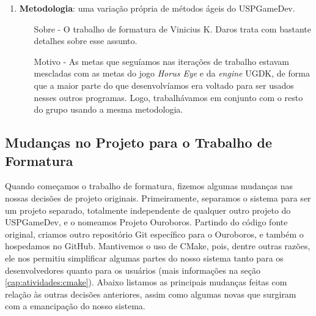 \begin{enumerate}
    \item \textbf{Metodologia}: uma variação própria de métodos ágeis do USPGameDev.
      \begin{itemize}
        \item[Sobre -] O trabalho de formatura de Vinicius K. Daros
          \cite{scrum:00} trata com bastante detalhes sobre esse assunto.
        \item[Motivo -] As metas que seguíamos nas iterações de trabalho
          estavam mescladas com as metas do jogo \textit{Horus Eye} e da
          \textit{engine} UGDK, de forma que a maior parte do que
          desenvolvíamos era voltado para ser usados nesses outros
          programas. Logo, trabalhávamos em conjunto com o resto do
          grupo usando a mesma metodologia.
      \end{itemize}

  \end{enumerate}

  \subsection{Mudanças no Projeto para o Trabalho de Formatura}
  Quando começamos o trabalho de formatura, fizemos algumas mudanças nas nossas
  decisões de projeto originais. Primeiramente, separamos o sistema para ser um
  projeto separado, totalmente independente de qualquer outro projeto do
  USPGameDev, e o nomeamos Projeto Ouroboros. Partindo do código fonte
  original, criamos outro repositório Git específico para o Ouroboros, e também
  o hospedamos no GitHub. Mantivemos o uso de CMake, pois, dentre outras razões,
  ele nos permitiu simplificar algumas partes do nosso sistema tanto para os
  desenvolvedores quanto para os usuários (mais informações na seção
  \ref{cap:atividades:cmake}). Abaixo listamos as principais mudanças feitas
  com relação às outras decisões anteriores, assim como algumas novas que
  surgiram com a emancipação do nosso sistema.
  
